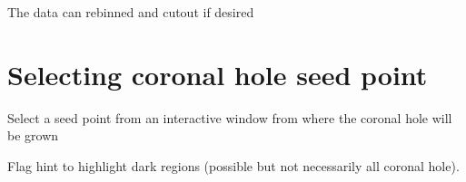 \documentclass[letterpaper,10pt,english]{sphinxmanual}
\begin{document}
\begin{sphinxVerbatim}[commandchars=\\\{\}]
\end{sphinxVerbatim}

\sphinxAtStartPar
The data can rebinned and cutout if desired

\begin{sphinxVerbatim}[commandchars=\\\{\}]
 
\end{sphinxVerbatim}


\section{Selecting coronal hole seed point}
\label{\detokenize{getting_started:selecting-coronal-hole-seed-point}}
\sphinxAtStartPar
Select a seed point from an interactive window from where the coronal hole will be grown

\begin{sphinxVerbatim}[commandchars=\\\{\}]
\end{sphinxVerbatim}

\sphinxAtStartPar
Flag hint to highlight dark regions (possible but not necessarily all coronal hole).
\end{document}
